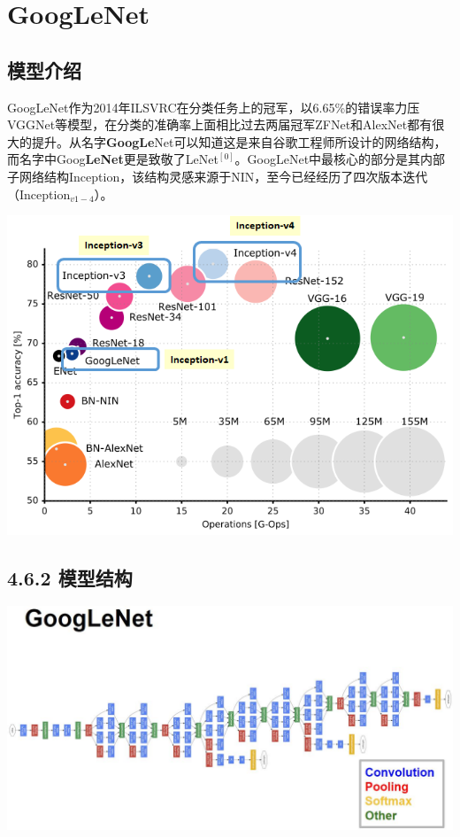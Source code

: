 \documentclass[12pt,a4paper,UTF8,twoside]{book}
\begin{document}
\hypertarget{googlenet}{%
\section{GoogLeNet}\label{googlenet}}

\hypertarget{ux6a21ux578bux4ecbux7ecd-5}{%
\subsection{模型介绍}\label{ux6a21ux578bux4ecbux7ecd-5}}

GoogLeNet作为2014年ILSVRC在分类任务上的冠军，以6.65\%的错误率力压VGGNet等模型，在分类的准确率上面相比过去两届冠军ZFNet和AlexNet都有很大的提升。从名字\textbf{GoogLe}Net可以知道这是来自谷歌工程师所设计的网络结构，而名字中Goog\textbf{LeNet}更是致敬了LeNet\(^{[0]}\)。GoogLeNet中最核心的部分是其内部子网络结构Inception，该结构灵感来源于NIN，至今已经经历了四次版本迭代（Inception\(_{v1-4}\)）。

\begin{center}\includegraphics[width=0.7\linewidth]{img/02-09} \end{center}

\hypertarget{ux6a21ux578bux7ed3ux6784-5}{%
\subsection{4.6.2 模型结构}\label{ux6a21ux578bux7ed3ux6784-5}}

\begin{center}\includegraphics[width=0.7\linewidth]{img/02-10} \end{center}
\end{document}
